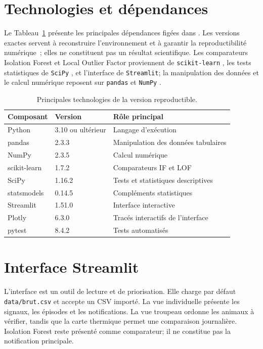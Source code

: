 \section{Technologies et dépendances}

Le Tableau~\ref{tab:technologies} présente les principales dépendances figées dans
. Les versions exactes servent à reconstruire l'environnement et à
garantir la reproductibilité numérique~; elles ne constituent pas un résultat scientifique.
Les comparateurs Isolation Forest et Local Outlier Factor proviennent de \texttt{scikit-learn}
\citep{sklearn_api}, les tests statistiques de \texttt{SciPy} \citep{virtanen2020scipy},
et l'interface de \texttt{Streamlit}; la manipulation des données et le calcul numérique
reposent sur \texttt{pandas} \citep{mckinney2010data} et \texttt{NumPy} \citep{harris2020array}.

\begin{table}[H]
  \centering
  \caption{Principales technologies de la version reproductible.}
  \label{tab:technologies}
  \small
  \begin{tabular}{lll}
    \toprule
    Composant & Version & Rôle principal \\
    \midrule
    Python & 3.10 ou ultérieur & Langage d'exécution \\
    pandas & 2.3.3 & Manipulation des données tabulaires \\
    NumPy & 2.3.5 & Calcul numérique \\
    scikit-learn & 1.7.2 & Comparateurs IF et LOF \\
    SciPy & 1.16.2 & Tests et statistiques descriptives \\
    statsmodels & 0.14.5 & Compléments statistiques \\
    Streamlit & 1.51.0 & Interface interactive \\
    Plotly & 6.3.0 & Tracés interactifs de l'interface \\
    pytest & 8.4.2 & Tests automatisés \\
    \bottomrule
  \end{tabular}
\end{table}

\section{Interface Streamlit}
\label{sec:interface_streamlit}

L'interface est un outil de lecture et de priorisation. Elle charge par défaut
\texttt{data/brut.csv} et accepte un CSV importé. La vue individuelle présente les signaux,
les épisodes et les notifications. La vue troupeau ordonne les animaux à vérifier, tandis
que la carte thermique permet une comparaison journalière. Isolation Forest reste présenté
comme comparateur; il ne constitue pas la notification principale.


